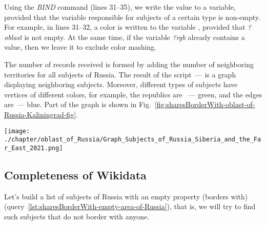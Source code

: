 
Using the \textit{BIND} command (lines 31--35), we write the value to a variable, provided that the variable responsible for subjects of a certain type is non-empty. For example, in lines 31--32, a color is written to the variable , provided that \textit{?oblast} is not empty. At the same time, if the variable \textit{?rgb} already contains a value, then we leave it to exclude color mashing.

The number of records received is formed by adding the number of neighboring territories for all subjects of Russia. The result of the script~--- is a graph displaying neighboring subjects. Moreover, different types of subjects have vertices of different colors, for example, the republics are ~--- green, and the edges are~--- blue. Part of the graph is shown in Fig.~\ref{fig:sharesBorderWith-oblast-of-Russia-Kaliningrad-fig}.

\begin{figure*}[h]
	\texttt{[image: ./chapter/oblast\_of\_Russia/Graph\_Subjects\_of\_Russia\_Siberia\_and\_the\_Far\_East\_2021.png]}
	\caption[Graph of the subjects of Russia. Kaliningrad, 2021.]{Regions of Russia in Siberia and the Far East for 2021. A fragment of the graph of neighboring subjects of Russia, built according to the query~\protect\ref{lst:sharesBorderWith-oblast-of-Russia}.
	Republics~--- green peaks (Yakutia).
	Autonomous Okrugs~--- purple peaks (Chukotka Autonomous Okrug).
	Edges~--- blue peaks (Khabarovsk Krai).
	Areas~--- pink peaks (Amur region).
	Autonomous regions~--- green-colored peaks (Jewish Autonomous Region).}%
      \label{fig:sharesBorderWith-oblast-of-Russia-Kaliningrad-fig}%
\end{figure*} 

\newpage
\subsection{Completeness of Wikidata}

Let's build a list of subjects of Russia with an empty property  (borders with) (query~\protect\ref{lst:sharesBorderWith-empty-area-of-Russia}), that is, we will try to find such subjects that do not border with anyone.

